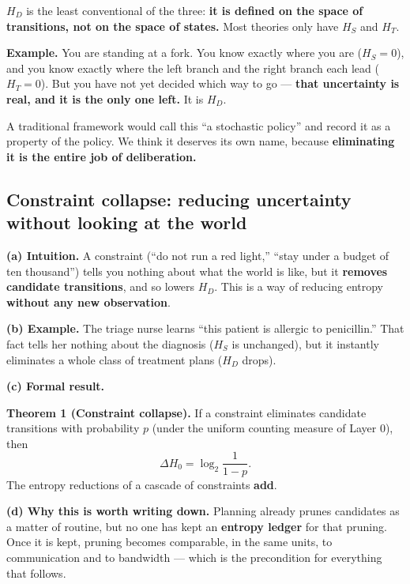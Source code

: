 \documentclass[11pt]{article}
\renewenvironment{quote}
  {\def\FrameCommand{{\color{gray!60}\vrule width 2pt}\hspace{8pt}}%
   \MakeFramed{\advance\hsize-\width \FrameRestore}\begin{itshape}}
  {\end{itshape}\endMakeFramed}
\begin{document}
\(H_D\) is the least conventional of the three: \textbf{it is defined on the space of transitions, not on the space of states.} Most theories only have \(H_S\) and \(H_T\).

\begin{quote}
\textbf{Example.} You are standing at a fork. You know exactly where you are (\(H_S=0\)), and you know exactly where the left branch and the right branch each lead (\(H_T=0\)). But you have not yet decided which way to go --- \textbf{that uncertainty is real, and it is the only one left.} It is \(H_D\).

A traditional framework would call this ``a stochastic policy'' and record it as a property of the policy. We think it deserves its own name, because \textbf{eliminating it is the entire job of deliberation.}
\end{quote}

\hypertarget{constraint-collapse-reducing-uncertainty-without-looking-at-the-world}{%
\subsection{Constraint collapse: reducing uncertainty without looking at the world}\label{constraint-collapse-reducing-uncertainty-without-looking-at-the-world}}

\textbf{(a) Intuition.} A constraint (``do not run a red light,'' ``stay under a budget of ten thousand'') tells you nothing about what the world is like, but it \textbf{removes candidate transitions}, and so lowers \(H_D\). This is a way of reducing entropy \textbf{without any new observation}.

\textbf{(b) Example.} The triage nurse learns ``this patient is allergic to penicillin.'' That fact tells her nothing about the diagnosis (\(H_S\) is unchanged), but it instantly eliminates a whole class of treatment plans (\(H_D\) drops).

\textbf{(c) Formal result.}

\begin{quote}
\textbf{Theorem 1 (Constraint collapse).} If a constraint eliminates candidate transitions with probability \(p\) (under the uniform counting measure of Layer 0), then
\[\Delta H_0=\log_2\frac{1}{1-p}.\]
The entropy reductions of a cascade of constraints \textbf{add}.
\end{quote}

\textbf{(d) Why this is worth writing down.} Planning already prunes candidates as a matter of routine, but no one has kept an \textbf{entropy ledger} for that pruning. Once it is kept, pruning becomes comparable, in the same units, to communication and to bandwidth --- which is the precondition for everything that follows.
\end{document}
